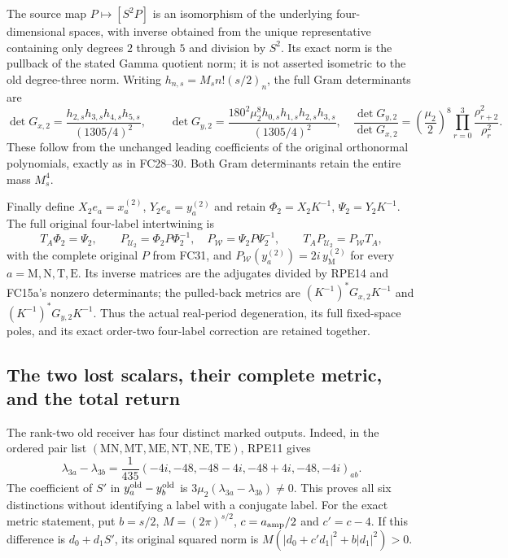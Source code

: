 \documentclass[11pt]{article}
\begin{document}
The source map $P\mapsto[S^2P]$ is an isomorphism of the underlying
four-dimensional spaces, with inverse obtained from the unique
representative containing only degrees $2$ through $5$ and division
by $S^2$. Its exact norm is the pullback of the stated Gamma quotient
norm; it is not asserted isometric to the old degree-three norm.
Writing $h_{n,s}=M_sn!(s/2)_n$, the full Gram determinants are
\[
 \det G_{x,2}=
   \frac{h_{2,s}h_{3,s}h_{4,s}h_{5,s}}{(1305/4)^2},\qquad
 \det G_{y,2}=
   \frac{180^2\mu_2^8h_{0,s}h_{1,s}h_{2,s}h_{3,s}}{(1305/4)^2},
 \quad
 \frac{\det G_{y,2}}{\det G_{x,2}}
   =\left(\frac{\mu_2}2\right)^8
      \prod_{r=0}^3\frac{\rho_{r+2}^2}{\rho_r^2}.
 \tag{RPE17}
\]
These follow from the unchanged leading coefficients of the original
orthonormal polynomials, exactly as in FC28--30. Both Gram
determinants retain the entire mass $M_s^4$.

Finally define $X_2e_a=x_a^{(2)}$, $Y_2e_a=y_a^{(2)}$ and retain
$\Phi_2=X_2K^{-1}$, $\Psi_2=Y_2K^{-1}$.
The full original four-label intertwining is
\[
 T_A\Phi_2=\Psi_2,\qquad
 P_{\mathcal U_2}=\Phi_2P\Phi_2^{-1},\quad
 P_{\mathcal W}=\Psi_2P\Psi_2^{-1},\qquad
 T_AP_{\mathcal U_2}=P_{\mathcal W}T_A,
 \tag{RPE18}
\]
with the complete original $P$ from FC31, and
$P_{\mathcal W}(y_a^{(2)})=2i\,y_{\mathrm M}^{(2)}$ for every
$a=\mathrm M,\mathrm N,\mathrm T,\mathrm E$.
Its inverse matrices are the adjugates divided by RPE14 and FC15a's
nonzero determinants; the pulled-back metrics are
$(K^{-1})^*G_{x,2}K^{-1}$ and $(K^{-1})^*G_{y,2}K^{-1}$.
Thus the actual real-period degeneration, its full fixed-space poles,
and its exact order-two four-label correction are retained together.

\subsection{The two lost scalars, their complete metric, and the total return}
The rank-two old receiver has four distinct marked outputs. Indeed,
in the ordered pair list $(\mathrm{MN},\mathrm{MT},\mathrm{ME},
\mathrm{NT},\mathrm{NE},\mathrm{TE})$, RPE11 gives
\[
 \lambda_{3a}-\lambda_{3b}
  =\frac1{435}(-4i,-48,-48-4i,-48+4i,-48,-4i)_{ab}.
 \tag{RPE19}
\]
The coefficient of $S'$ in $y_a^{\rm old}-y_b^{\rm old}$ is
$3\mu_2(\lambda_{3a}-\lambda_{3b})\ne0$. This proves all six
distinctions without identifying a label with a conjugate label.
For the exact metric statement, put $b=s/2$, $M=(2\pi)^{s/2}$,
$c=a_{\rm amp}/2$ and $c'=c-4$. If this difference is $d_0+d_1S'$,
its original squared norm is
$M(|d_0+c'd_1|^2+b|d_1|^2)>0$.
\end{document}
